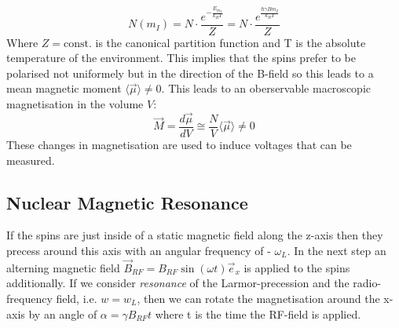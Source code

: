 			\begin{equation}
				N(m_I) = N \cdot \frac{e^{-\frac{E_{m_I}}{k_BT}}}{Z} = N \cdot \frac{e^{\frac{\hbar \gamma B m_I}{k_BT}}}{Z}
			\end{equation}
		Where $Z = \text{const.}$ is the canonical partition function and T is the absolute temperature of the environment. This implies that the spins prefer to be polarised not uniformely but in the direction of the B-field so this leads to a mean magnetic moment $\langle\vec{\mu}\rangle \neq 0$. This leads to an oberservable macroscopic magnetisation in the volume $V$:
			\begin{equation}
				\vec{M} = \frac{d\vec{\mu}}{dV} \cong \frac{N}{V} \langle\vec{\mu}\rangle \neq 0
			\end{equation}
		These changes in magnetisation are used to induce voltages that can be measured.
		
	\subsection{Nuclear Magnetic Resonance}
		If the spins are just inside of a static magnetic field along the z-axis then they precess around this axis with an angular frequency of - $\omega_L$. In the next step an alterning magnetic field $\vec{B}_{RF} = B_{RF}\sin(\omega t)\vec{e}_x$ is applied to the spins additionally. If we consider \textit{resonance} of the Larmor-precession and the radio-frequency field, i.e. $w = w_L$, then we can rotate the magnetisation around the x-axis by an angle of $\alpha = \gamma B_{RF}t$ where t is the time the RF-field is applied.  